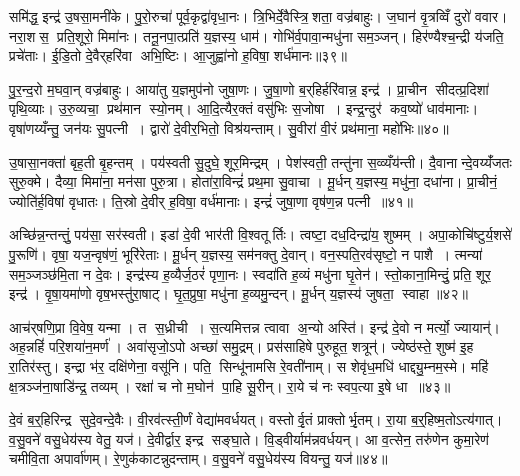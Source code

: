 समि॑द्ध॒ इन्द्र॑ उ॒षसा॒मनी॑के। पु॒रो॒रुचा॑ पूर्व॒कृद्वा॑वृधा॒नः। त्रि॒भिर्दे॒वैस्त्रि॒शता॒ वज्र॑बाहुः। ज॒घान॑ वृ॒त्रव्विँ दुरो॑ ववार। नरा॒शस॒ प्रति॒शूरो॒ मिमा॑नः। तनू॒नपा॒त्प्रति॑ य॒ज्ञस्य॒ धाम॑। गोभि॑र्व॒पावा॒न्मधु॑ना सम॒ञ्जन्। हिर॑ण्यैश्च॒न्द्री य॑जति॒ प्रचे॑ताः। ई॒डि॒तो दे॒वैर्‌हरि॑वा अभि॒ष्टिः। आ॒जुह्वा॑नो ह॒विषा॒ शर्ध॑मानः॥३९॥

पु॒र॒न्द॒रो म॒घवा॒न् वज्र॑बाहुः। आया॑तु य॒ज्ञमुप॑नो जुषा॒णः। जु॒षा॒णो ब॒र्‌हिर्हरि॑वान्न॒ इन्द्र॑। प्रा॒चीन सीदत्प्र॒दिशा॑ पृथि॒व्याः। उ॒रु॒व्यचा॒ प्रथ॑मान स्यो॒नम्। आ॒दि॒त्यैर॒क्तं वसु॑भिः स॒जोषा। इन्द्र॒न्दुर॑ कव॒ष्यो॑ धाव॑मानाः। वृषा॑णय्यँन्तु॒ जन॑यः सु॒पत्नी। द्वारो॑ दे॒वीर॒भितो॒ विश्र॑यन्ताम्। सु॒वीरा॑ वी॒रं प्रथ॑माना॒ महो॑भिः॥४०॥

उ॒षासा॒नक्ता॑ बृह॒ती बृ॒हन्तम्। पय॑स्वती सु॒दुघे॒ शूर॒मिन्द्रम्। पेश॑स्वती॒ तन्तु॑ना स॒व्व्यँय॑न्ती। दै॒वानान्दे॒वय्यँ॑जतः सुरु॒क्मे। दैव्या॒ मिमा॑ना॒ मन॑सा पुरु॒त्रा। होता॑रा॒विन्द्रं॑ प्रथ॒मा सु॒वाचा। मू॒र्धन् य॒ज्ञस्य॒ मधु॑ना॒ दधा॑ना। प्रा॒चीनं॒ ज्योति॑र्\mbox{}ह॒विषा॑ वृधातः। ति॒स्रो दे॒वीर्‌ ह॒विषा॒ वर्ध॑मानाः। इन्द्रं॑ जुषा॒णा वृष॑ण॒न्न पत्नी॥४१॥

अच्छि॑न्न॒न्तन्तुं॒ पय॑सा॒ सर॑स्वती। इडा॑ दे॒वी भार॑ती वि॒श्वतूर्तिः। त्वष्टा॒ दध॒दिन्द्रा॑य॒ शुष्मम्। अपा॒कोचि॑ष्टुर्य॒शसे॑ पु॒रूणि॑। वृषा॒ यज॒न्वृष॑णं॒ भूरि॑रेताः। मू॒र्धन् य॒ज्ञस्य॒ सम॑नक्तु दे॒वान्। वन॒स्पति॒रव॑सृष्टो॒ न पाशै। त्मन्या॑ सम॒ञ्जञ्छ॑मि॒ता न दे॒वः। इन्द्र॑स्य ह॒व्यैर्ज॒ठरं॑ पृणा॒नः। स्वदा॑ति ह॒व्यं मधु॑ना घृ॒तेन॑। स्तो॒काना॒मिन्दुं॒ प्रति॒ शूर॒ इन्द्र॑। वृ॒षा॒यमा॑णो वृष॒भस्तु॑रा॒षाट्। घृ॒त॒प्रुषा॒ मधु॑ना ह॒व्यमु॒न्दन्। मू॒र्धन् य॒ज्ञस्य॑ जुषता॒ स्वाहा॥४२॥\anuvakamend[शर्ध॑मानो॒ महो॑भि॒ पत्नीर्घृ॒तेन॑ च॒त्वारि॑ च]

आच॑र्‌षणि॒प्रा वि॒वेष॒ यन्मा। त स॒ध्रीची। स॒त्यमित्तन्न त्वावा अ॒न्यो अस्ति॑। इन्द्र॑ दे॒वो न मर्त्यो॒ ज्यायान्॑। अह॒न्नहिं॑ परि॒शया॑न॒मर्ण॑। अवा॑सृजो॒ऽपो अच्छा॑ समु॒द्रम्। प्रस॑साहिषे पुरुहूत॒ शत्रून्॑। ज्येष्ठ॑स्ते॒ शुष्म॑ इ॒ह रा॒तिर॑स्तु। इन्द्रा भ॑र॒ दक्षि॑णेना॒ वसू॑नि। पति॒ सिन्धू॑नामसि रे॒वती॑नाम्। स शेवृ॑ध॒मधि॑ धाद्द्यु॒म्नम॒स्मे। महि॑ क्ष॒त्रञ्ज॑ना॒षाडि॑न्द्र॒ तव्यम्। रक्षा॑ च नो म॒घोन॑ पा॒हि सू॒रीन्। रा॒ये च॑ नः स्वप॒त्या इ॒षे धा॥४३॥\anuvakamend[रे॒वती॑नाञ्च॒त्वारि॑ च]

दे॒वं ब॒र्॒हिरिन्द्र सुदे॒वन्दे॒वैः। वी॒रव॑त्स्ती॒र्णं वेद्या॑मवर्धयत्। वस्तोर्वृ॒तं प्राक्तोर्भृ॒तम्। रा॒या ब॒र्॒हिष्म॒तोऽत्य॑गात्। व॒सु॒वने॑ वसु॒धेय॑स्य वेतु॒ यज॑। दे॒वीर्द्वार॒ इन्द्र सङ्घा॒ते। वि॒ड्वीर्याम॑न्नवर्धयन्। आ व॒त्सेन॒ तरु॑णेन कुमा॒रेण॑ चमीवि॒ता अपार्वा॑णम्। रे॒णुक॑काटन्नुदन्ताम्। व॒सु॒वने॑ वसु॒धेय॑स्य वियन्तु॒ यज॑॥४४॥

